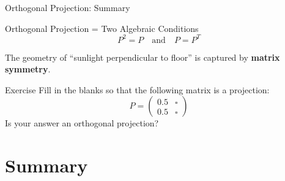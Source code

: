 \documentclass[10pt]{beamer}
\theoremstyle{definition}
\newcommand{\x}[1]{\alert{\textbf{#1}}}
\begin{document}
\begin{frame}{Orthogonal Projection: Summary}

\begin{alertblock}{Orthogonal Projection = Two Algebraic Conditions}
$$\boxed{P^2 = P \quad\text{and}\quad P = P^T}$$

The geometry of ``sunlight perpendicular to floor'' is captured by \x{matrix symmetry}.
\end{alertblock}

\vspace{1em}

\begin{exampleblock}{Exercise}
Fill in the blanks so that the following matrix is a projection:
$$P = \begin{pmatrix} 0.5 & \square \\ 0.5 & \square \end{pmatrix}$$
Is your answer an orthogonal projection?
\end{exampleblock}

\end{frame}

\section{Summary}
\end{document}
